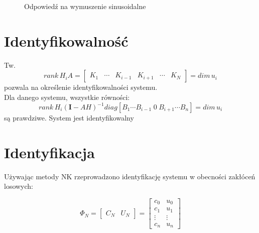 \documentclass{article}
\begin{document}
\begin{figure}[ht]
\centering
{}
\caption{Odpowiedź na wymuszenie sinusoidalne}
\end{figure}


\section{Identyfikowalność}

Tw.  
\begin{equation}
rank \hspace{2pt}H_i
A = \begin{bmatrix}
K_1 & \cdots & K_{i-1} & K_{i+1} & \cdots & K_N
\end{bmatrix}
 = dim \hspace{2pt} u_i 
\end{equation}
pozwala na określenie identyfikowalności systemu. \\
Dla danego systemu, wszystkie równości:
\begin{equation}
rank \hspace{2pt}H_i (\mathbf{I} - A H)^{-1} diag [B_1 \cdots B_{i-1} \hspace{3pt} 0 \hspace{3pt} B_{i+1} \cdots B_n] = dim \hspace{2pt} u_i 
\end{equation}
są prawdziwe. System jest identyfikowalny

\section{Identyfikacja}

Używając metody NK rzeprowadzono identyfikację systemu w obecności zakłóceń losowych:

\begin{equation}
\Phi_N = \begin{bmatrix}
C_{N} & U_N
\end{bmatrix}
 = \begin{bmatrix}
c_0 & u_0 \\ 
c_1 & u_1 \\ 
\vdots & \vdots \\ 
c_n & u_n
\end{bmatrix}
\end{equation}
\end{document}
